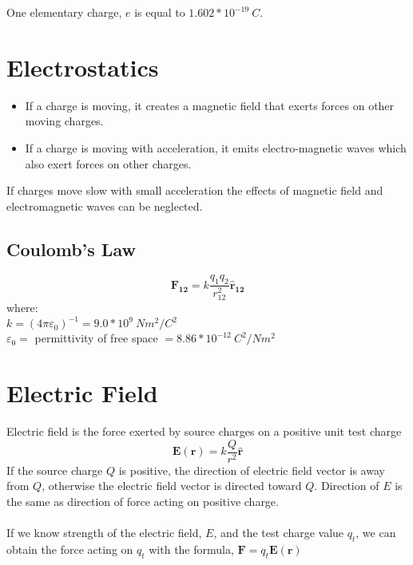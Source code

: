 \documentclass{article}
\begin{document}
One elementary charge, $e$ is equal to $1.602*10^{-19} \: C$.

\section*{Electrostatics}
\begin{itemize}
    \item If a charge is moving, it creates a magnetic field that exerts forces on other moving charges.
    \item If a charge is moving with acceleration, it emits electro-magnetic waves which also exert forces on other charges.
\end{itemize}
If charges move slow with small acceleration the effects of magnetic field and electromagnetic
waves can be neglected.
\subsection*{Coulomb's Law}
\[\pmb{F_{12}}=k\frac{q_1 q_2}{r_{12}^2}\pmb{\hat{r}_{12}}\]
where: \\
$k={(4\pi\varepsilon_0)}^{-1}=9.0*10^9 \: N m^2 / C^2$ \\
$\varepsilon_0=$ permittivity of free space $= 8.86 * 10^{-12} \: C^2 / N m^2$

\section*{Electric Field}
Electric field is the force exerted by source charges on a positive unit test charge
\[\pmb{E(r)}=k\frac{Q}{r^2}\pmb{\hat{r}}\]
If the source charge $Q$ is positive, the direction of electric field vector is away from $Q$,
otherwise the electric field vector is directed toward $Q$. Direction of $E$ is the same as
direction of force acting on positive charge. \\ \\
If we know strength of the electric field, $E$, and the test charge value $q_t$, we can obtain the
force acting on $q_t$ with the formula, $\pmb{F} = q_t \pmb{E(r)}$
\end{document}
